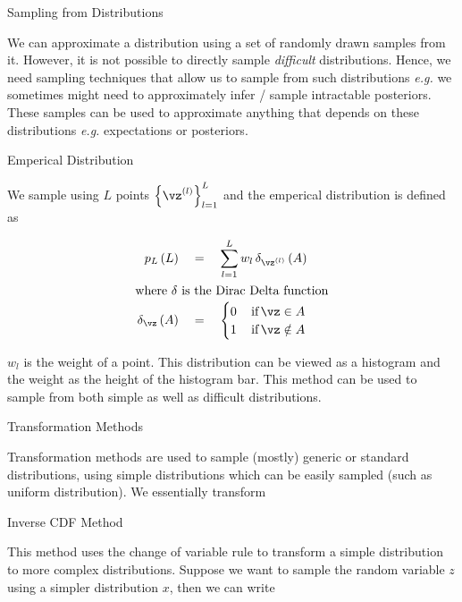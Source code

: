 \documentclass{article}
\begin{document}
\begin{ssection}{Sampling from Distributions}

	We can approximate a distribution using a set of randomly drawn samples from it. However, it is not possible to directly sample \textit{difficult} distributions. Hence, we need sampling techniques that allow us to sample from such distributions \textit{e.g.} we sometimes might need to approximately infer / sample intractable posteriors. These samples can be used to approximate anything that depends on these distributions \textit{e.g.} expectations or posteriors.

	\begin{sssubsection}{Emperical Distribution}

		We sample using $L$ points $\set{\vz^{(l)}}_{l = 1}^{L}$ and the emperical distribution is defined as

		\begin{align*}
			\prob[L]{L}				&\eq \sum_{l = 1}^{L} w_l \func{\delta_{\vz^{(l)}}}{A} \\
			\shortintertext{where $\delta$ is the Dirac Delta function}
			\func{\delta_{\vz}}{A}	&\eq 
				\begin{cases}
					0	& \mt{if} \vz \in A \\
					1	& \mt{if} \vz \notin A
				\end{cases}
		\end{align*} \br%

		$w_l$ is the weight of a point. This distribution can be viewed as a histogram and the weight as the height of the histogram bar. This method can be used to sample from both simple as well as difficult distributions.

	\end{sssubsection}

	\begin{ssubsection}{Transformation Methods}

		Transformation methods are used to sample (mostly) generic or standard distributions, using simple distributions which can be easily sampled (such as uniform distribution). We essentially transform
			
		\begin{sssubsection}{Inverse CDF Method}

			This method uses the change of variable rule to transform a simple distribution to more complex distributions. Suppose we want to sample the random variable $z$ using a simpler distribution $x$, then we can write


\end{sssubsection}
\end{ssubsection}
\end{ssection}
\end{document}
